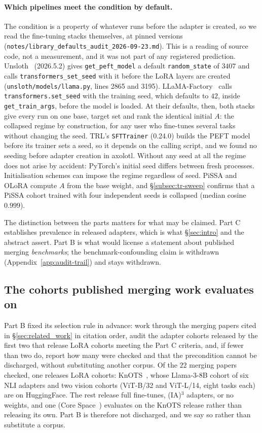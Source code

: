 \paragraph{Which pipelines meet the condition by default.} The condition is a
property of whatever runs before the adapter is created, so we read the
fine-tuning stacks themselves, at pinned versions
(\texttt{notes/library\_defaults\_audit\_2026-09-23.md}). This is a reading of
source code, not a measurement, and it was not part of any registered
prediction. Unsloth~\citep{unsloth2026} (2026.5.2) gives
\texttt{get\_peft\_model} a default \texttt{random\_state} of $3407$ and calls
\texttt{transformers\_set\_seed} with it before the LoRA layers are created
(\texttt{unsloth/models/llama.py}, lines 2865 and 3195).
LLaMA-Factory~\citep{zheng2024llamafactory} calls \texttt{transformers.set\_seed}
with the training seed, which defaults to $42$, inside \texttt{get\_train\_args},
before the model is loaded. At their defaults, then, both stacks give every run
on one base, target set and rank the identical initial $A$: the collapsed
regime by construction, for any user who fine-tunes several tasks without
changing the seed. TRL's \texttt{SFTTrainer} (0.24.0) builds the PEFT model
before its trainer sets a seed, so it depends on the calling script, and we
found no seeding before adapter creation in axolotl. Without any seed at all
the regime does not arise by accident: PyTorch's initial seed differs between
fresh processes. Initialisation schemes can impose the regime regardless of
seed. PiSSA and OLoRA compute $A$ from the base weight, and
\S\ref{subsec:tr-sweep} confirms that a PiSSA cohort trained with four
independent seeds is collapsed (median cosine $0.999$).

The distinction between the parts matters for what may be claimed. Part C
establishes prevalence in released adapters, which is what \S\ref{sec:intro}
and the abstract assert. Part B is what would license a statement about
published merging \emph{benchmarks}; the benchmark-confounding claim is
withdrawn (Appendix~\ref{app:audit-trail}) and stays withdrawn.

\subsection{The cohorts published merging work evaluates on}
\label{subsec:part-b}

Part B fixed its selection rule in advance: work through the merging papers
cited in \S\ref{sec:related_work} in citation order, audit the adapter
cohorts released by the first two that release LoRA cohorts meeting the Part C
criteria, and, if fewer than two do, report how many were checked and that the
precondition cannot be discharged, without substituting another corpus. Of the
$22$ merging papers checked, one releases LoRA cohorts: KnOTS~\citep{stoica2025knots},
whose Llama-3-8B cohort of six NLI adapters and two vision cohorts (ViT-B/32 and
ViT-L/14, eight tasks each) are on HuggingFace. The rest release full
fine-tunes, (IA)$^3$ adapters, or no weights, and one (Core
Space~\citep{panariello2025core}) evaluates on the KnOTS release rather than
releasing its own. Part B is therefore not discharged, and we say so rather
than substitute a corpus.

